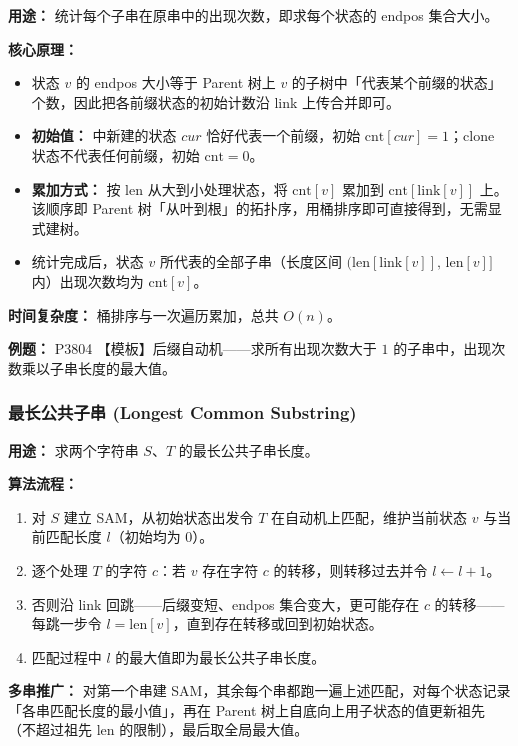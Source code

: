 \textbf{用途：} 统计每个子串在原串中的出现次数，即求每个状态的 endpos 集合大小。

\textbf{核心原理：}
\begin{itemize}
  \item 状态 $v$ 的 endpos 大小等于 Parent 树上 $v$ 的子树中「代表某个前缀的状态」个数，因此把各前缀状态的初始计数沿 link 上传合并即可。
  \item \textbf{初始值：}  中新建的状态 $cur$ 恰好代表一个前缀，初始 $\text{cnt}[cur] = 1$；clone 状态不代表任何前缀，初始 $\text{cnt} = 0$。
  \item \textbf{累加方式：} 按 len 从大到小处理状态，将 $\text{cnt}[v]$ 累加到 $\text{cnt}[\text{link}[v]]$ 上。该顺序即 Parent 树「从叶到根」的拓扑序，用桶排序即可直接得到，无需显式建树。
  \item 统计完成后，状态 $v$ 所代表的全部子串（长度区间 $(\text{len}[\text{link}[v]],\, \text{len}[v]]$ 内）出现次数均为 $\text{cnt}[v]$。
\end{itemize}

\textbf{时间复杂度：} 桶排序与一次遍历累加，总共 $O(n)$。

\textbf{例题：} P3804 【模板】后缀自动机——求所有出现次数大于 $1$ 的子串中，出现次数乘以子串长度的最大值。



\subsubsection{最长公共子串 (Longest Common Substring)}

\textbf{用途：} 求两个字符串 $S$、$T$ 的最长公共子串长度。

\textbf{算法流程：}
\begin{enumerate}
  \item 对 $S$ 建立 SAM，从初始状态出发令 $T$ 在自动机上匹配，维护当前状态 $v$ 与当前匹配长度 $l$（初始均为 $0$）。
  \item 逐个处理 $T$ 的字符 $c$：若 $v$ 存在字符 $c$ 的转移，则转移过去并令 $l \leftarrow l + 1$。
  \item 否则沿 link 回跳——后缀变短、endpos 集合变大，更可能存在 $c$ 的转移——每跳一步令 $l = \text{len}[v]$，直到存在转移或回到初始状态。
  \item 匹配过程中 $l$ 的最大值即为最长公共子串长度。
\end{enumerate}

\textbf{多串推广：} 对第一个串建 SAM，其余每个串都跑一遍上述匹配，对每个状态记录「各串匹配长度的最小值」，再在 Parent 树上自底向上用子状态的值更新祖先（不超过祖先 $\text{len}$ 的限制），最后取全局最大值。


